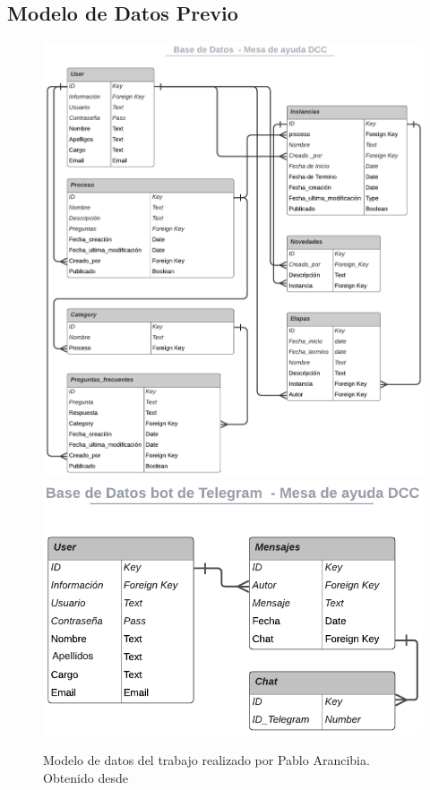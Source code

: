     \subsection{Modelo de Datos Previo}
        \begin{figure}[h]
            \centering
            \includegraphics[scale=0.25]{media/imagenes/trabajo_previo/modelo_datos.png}
            \includegraphics[scale=0.25]{media/imagenes/trabajo_previo/modelo_datos_bot.png}
            \caption[Modelo de datos]{Modelo de datos del trabajo realizado por Pablo Arancibia. Obtenido desde \cite{ARANCIBIA2021}}
            \label{fig:md-previo}
        \end{figure}
        
